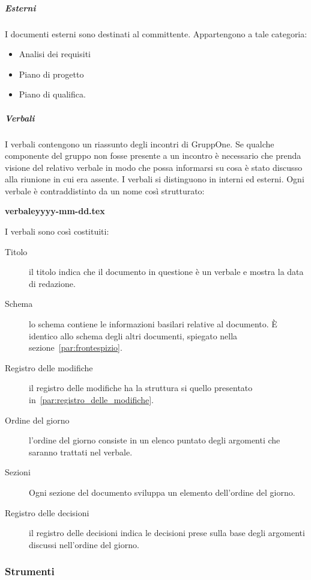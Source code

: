 \documentclass[../norme-di-progetto.tex]{subfiles}
\begin{document}
\subparagraph{Esterni}%
\label{subp:suddivisione_dei_documenti/esterni}
I documenti esterni sono destinati al committente. Appartengono a tale categoria:

\begin{itemize}
  \item Analisi dei requisiti
  \item Piano di progetto
  \item Piano di qualifica.
\end{itemize}

\subparagraph{Verbali}%
\label{subp:verbali}
I verbali contengono un riassunto degli incontri di GruppOne.
Se qualche componente del gruppo non fosse presente a un incontro è necessario che prenda visione del relativo verbale in modo che possa informarsi su cosa è stato discusso alla riunione in cui era assente.
I verbali si distinguono in interni ed esterni. Ogni verbale è contraddistinto da un nome così strutturato:
\begin{center}
  \textbf{verbaleyyyy-mm-dd.tex}
\end{center}
I verbali sono così costituiti:

\begin{description}
  \item [Titolo] il titolo indica che il documento in questione è un verbale e mostra la data di redazione.
  \item [Schema] lo schema contiene le informazioni basilari relative al documento. È identico allo schema degli altri documenti, spiegato nella sezione~\ref{par:frontespizio}.
  \item [Registro delle modifiche] il registro delle modifiche ha la struttura si quello presentato in~\ref{par:registro_delle_modifiche}.
  \item [Ordine del giorno] l'ordine del giorno consiste in un elenco puntato degli argomenti che saranno trattati nel verbale.
  \item [Sezioni] Ogni sezione del documento sviluppa un elemento dell'ordine del giorno.
  \item [Registro delle decisioni] il registro delle decisioni indica le decisioni prese sulla base degli argomenti discussi nell'ordine del giorno.
\end{description}

\subsubsection{Strumenti}
\end{document}
